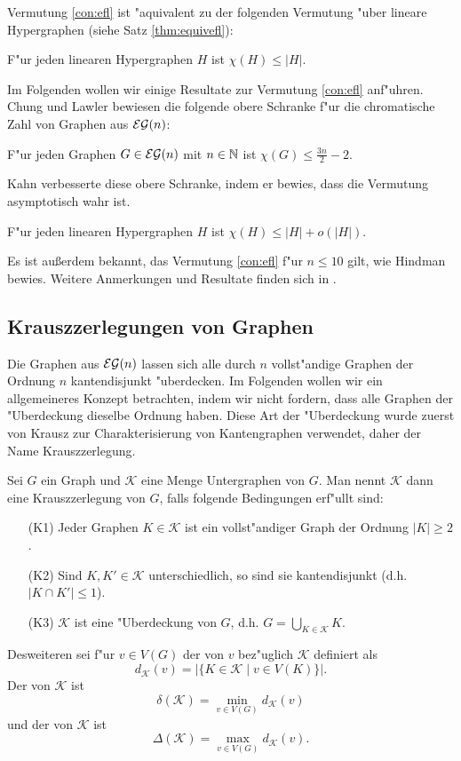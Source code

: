Vermutung \ref{con:efl} ist "aquivalent zu der folgenden Vermutung "uber lineare Hypergraphen (siehe Satz \ref{thm:equivefl}):
\begin{conjecture}
  F"ur jeden linearen Hypergraphen $H$ ist $\chi(H) \leq |H|$.
  \label{con:eflhyper}
\end{conjecture}

Im Folgenden wollen wir einige Resultate zur Vermutung \ref{con:efl} anf"uhren. Chung und Lawler \cite{ChungL88} bewiesen die folgende obere Schranke f"ur die chromatische Zahl von Graphen aus ${\cal EG}(n)$:

\begin{theorem}
  F"ur jeden Graphen $G\in{\cal EG}(n)$ mit $n\in{\mathbb{N}}$ ist $\chi(G) \leq \frac{3n}{2}-2$.
  \label{thm:ChungLawler}
\end{theorem}
Kahn \cite{Kahn92} verbesserte diese obere Schranke, indem er bewies, dass die Vermutung asymptotisch wahr ist.
\begin{theorem}
  F"ur jeden linearen Hypergraphen $H$ ist $\chi(H) \leq |H| + o(|H|)$.
  \label{thm:kahn}
\end{theorem}

Es ist au{\ss}erdem bekannt, das Vermutung \ref{con:efl} f"ur $n\leq 10$ gilt, wie Hindman \cite{Hindman81} bewies.
Weitere Anmerkungen und Resultate finden sich in \cite{RomeroS2007}.

\subsection{Krauszzerlegungen von Graphen}
Die Graphen aus ${\cal EG}(n)$ lassen sich alle durch $n$ vollst"andige Graphen der Ordnung $n$ kantendisjunkt "uberdecken. Im Folgenden wollen wir ein allgemeineres Konzept betrachten, indem wir nicht fordern, dass alle Graphen der "Uberdeckung dieselbe Ordnung haben. 
Diese Art der "Uberdeckung wurde zuerst von Krausz \cite{Krausz43} zur Charakterisierung von Kantengraphen verwendet, daher der Name Krauszzerlegung. 

Sei $G$ ein Graph und $\mathcal{K}$ eine Menge Untergraphen von $G$. Man nennt $\mathcal{K}$ dann eine Krauszzerlegung von $G$, falls folgende Bedingungen erf"ullt sind:
\begin{enumerate}
  \item[\rm{(K1)}] Jeder Graphen $K\in \mathcal{K}$ ist ein vollst"andiger Graph der Ordnung $|K| \geq 2$. 
  \item[\rm{(K2)}] Sind $K,K'\in \mathcal{K}$ unterschiedlich, so sind sie kantendisjunkt (d.h. $|K\cap K'| \leq 1$).
  \item[\rm{(K3)}] $\mathcal K$ ist eine "Uberdeckung von $G$, d.h.  $G=\bigcup\limits_{K\in \mathcal K}K$.
\end{enumerate}
Desweiteren sei f"ur $v\in V(G)$ der  von $v$ bez"uglich $\mathcal K$ definiert als $$d_{\mathcal{K}}(v) = |\{ K\in\mathcal K \;|\;  v \in V(K)\}|.$$ Der  von $\mathcal K$ ist $$\delta(\mathcal K) = \min\limits_{v\in V(G)}d_{\mathcal{K}}(v)$$ und der  von $\mathcal{K}$ ist $$\Delta(\mathcal{K}) = \max\limits_{v\in V(G)}d_{\mathcal{K}}(v).$$


